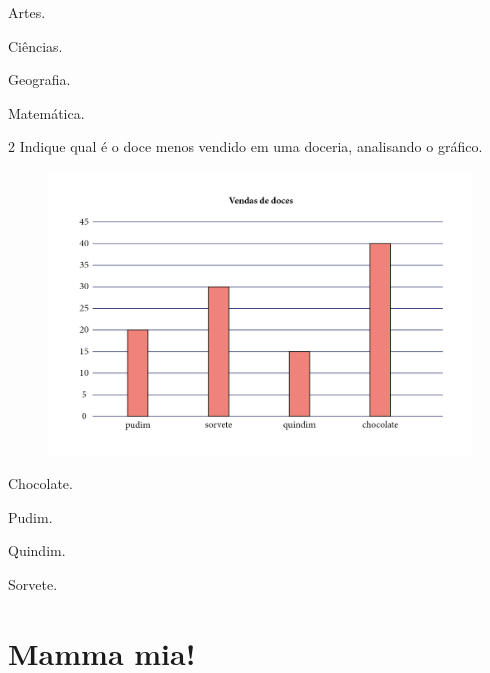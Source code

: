 \begin{escolha}[itemsep=-5pt]
\begin{multicols}{2}
\item Artes.

\item Ciências.

\item Geografia.

\item Matemática.
\end{multicols}
\end{escolha}

\num{2} Indique qual é o doce menos vendido em uma doceria, analisando o gráfico.

\begin{figure}[H]
\includegraphics[width=\textwidth]{./media/image101.png}
\end{figure}

\begin{escolha}[itemsep=-5pt]
\item Chocolate.

\item Pudim.

\item Quindim.

\item Sorvete.
\end{escolha}

\pagebreak

\chapter{Mamma mia!}


